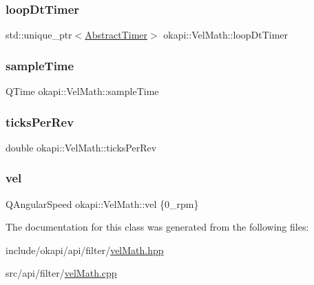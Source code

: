 \mbox{\label{classokapi_1_1VelMath_a36a8a63ac4b47806259e080cfbd0d462}} 
\subsubsection{\texorpdfstring{loopDtTimer}{loopDtTimer}}
{\footnotesize\ttfamily std\+::unique\+\_\+ptr$<$\mbox{\hyperlink{classokapi_1_1AbstractTimer}{Abstract\+Timer}}$>$ okapi\+::\+Vel\+Math\+::loop\+Dt\+Timer\hspace{0.3cm}{\ttfamily [protected]}}

\mbox{\label{classokapi_1_1VelMath_a015a781b3f7f454f24b1a86a43a9a76d}} 
\subsubsection{\texorpdfstring{sampleTime}{sampleTime}}
{\footnotesize\ttfamily Q\+Time okapi\+::\+Vel\+Math\+::sample\+Time\hspace{0.3cm}{\ttfamily [protected]}}

\mbox{\label{classokapi_1_1VelMath_ad889516cc153d23febbbfd4c9c45e5ec}} 
\subsubsection{\texorpdfstring{ticksPerRev}{ticksPerRev}}
{\footnotesize\ttfamily double okapi\+::\+Vel\+Math\+::ticks\+Per\+Rev\hspace{0.3cm}{\ttfamily [protected]}}

\mbox{\label{classokapi_1_1VelMath_af8386892892d453a118581e46839a0c3}} 
\subsubsection{\texorpdfstring{vel}{vel}}
{\footnotesize\ttfamily Q\+Angular\+Speed okapi\+::\+Vel\+Math\+::vel \{0\+\_\+rpm\}\hspace{0.3cm}{\ttfamily [protected]}}



The documentation for this class was generated from the following files\+:\begin{DoxyCompactItemize}
\item 
include/okapi/api/filter/\mbox{\hyperlink{velMath_8hpp}{vel\+Math.\+hpp}}\item 
src/api/filter/\mbox{\hyperlink{velMath_8cpp}{vel\+Math.\+cpp}}\end{DoxyCompactItemize}

